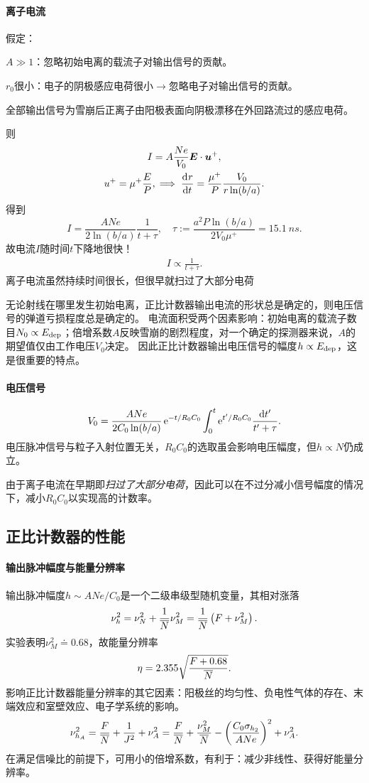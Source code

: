 \paragraph{离子电流}假定：
\begin{compactenum}
	\item $A\gg 1$：忽略初始电离的载流子对输出信号的贡献。
	\item $r_0$很小：电子的阴极感应电荷很小$\to$忽略电子对输出信号的贡献。
	\item 全部输出信号为雪崩后正离子由阳极表面向阴极漂移在外回路流过的感应电荷。
\end{compactenum}
则
\begin{gather*}
	I=A\frac{Ne}{V_0}\bm E\cdot\bm u^+,\\
	u^+=\mu^+\frac EP,\implies\frac{\mathrm{d}^{{}}r}{\mathrm{d}{t}^{{}}}=\frac{\mu^+}P\frac{V_0}{r\ln(b/a)}.
\end{gather*}
得到
\[
	I=\frac{ANe}{2\ln(b/a)}\frac1{t+\tau},\quad\tau:=\frac{a^2P\ln(b/a)}{2V_0\mu^+}=\SI{15.1}{ns}.
\]
故电流$I$随时间$t$下降地很快！
\begin{align}
	I\propto\frac1{t+\tau}.
\end{align}
离子电流虽然持续时间很长，但很早就扫过了大部分电荷

无论射线在哪里发生初始电离，正比计数器输出电流的形状总是确定的，则电压信号的弹道亏损程度总是确定的。
电流面积受两个因素影响：初始电离的载流子数目$N_0\propto E_{\mathrm{dep}}$；倍增系数$A$反映雪崩的剧烈程度，对一个确定的探测器来说，$A$的期望值仅由工作电压$V_0$决定。
因此正比计数器输出电压信号的幅度$h\propto E_{\mathrm{dep}}$，这是很重要的特点。
\paragraph{电压信号}
\[
	V_0=\frac{ANe}{2C_0\ln(b/a)}\mathop{}\!\mathrm{e}^{-t/R_0C_0}\int_0^t\mathop{}\!\mathrm{e}^{t'/R_0C_0}\frac{\mathop{}\!\mathrm{d} t'}{t'+\tau}.
\]
电压脉冲信号与粒子入射位置无关，$R_0C_0$的选取虽会影响电压幅度，但$h\propto N$仍成立。

由于离子电流在早期即\textit{扫过了大部分电荷}，因此可以在不过分减小信号幅度的情况下，减小$R_0C_0$以实现高的计数率。

\subsection{正比计数器的性能}

\paragraph{输出脉冲幅度与能量分辨率}
输出脉冲幅度$h\sim ANe/C_0$是一个二级串级型随机变量，其相对涨落
\[
	\nu_h^2=\nu_N^2+\frac1{\overline{N}}\nu_M^2=\frac1{\overline{N}}\left(F+\nu_M^2\right).
\]
实验表明$\nu_M^2\doteq 0.68$，故能量分辨率
\begin{align}
	\eta=2.355\sqrt{\frac{F+0.68}{\overline{N}}}.
\end{align}
影响正比计数器能量分辨率的其它因素：阳极丝的均匀性、负电性气体的存在、末端效应和室壁效应、电子学系统的影响。
\[
	\nu_{h_A}^2=\frac F{\overline{N}}+\frac1{J^2}+\nu_A^2=\frac F{\overline{N}}+\frac{\nu_M^2}{\overline{N}}-\left(\frac{C_0\sigma_{h_2}}{ANe}\right)^2+\nu_A^2.
\]
在满足信噪比的前提下，可用小的倍增系数，有利于：减少非线性、获得好能量分辨率。
